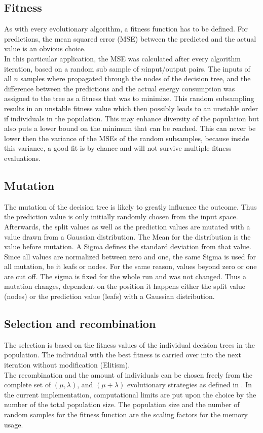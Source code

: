 \documentclass[conference]{IEEEtran}
\begin{document}
\subsection{Fitness}
As with every evolutionary algorithm, a fitness function has to be defined. For predictions, the mean squared error (MSE) between the predicted and the actual value is an obvious choice. \\
In this particular application, the MSE was calculated after every algorithm iteration, based on a random sub sample of $ n $input/output pairs. The inputs of all $n$ samples where propagated through the nodes of the decision tree, and the difference between the predictions and the actual energy consumption was assigned to the tree as a fitness that was to minimize. This random  subsampling results in an unstable fitness value which then possibly leads to an unstable order if individuals in the population. This may enhance diversity of the population but also puts a lower bound on the minimum that can be reached. This can never be lower then the variance of the MSEs of the random subsamples, because inside this variance, a good fit is by chance and will not survive multiple fitness evaluations.

\subsection{Mutation}
The mutation of the decision tree is likely to greatly influence the outcome. Thus the prediction value is only initially randomly chosen from the input space. Afterwards, the split values as well as the prediction values are mutated with a value drawn from a Gaussian distribution. The Mean for the distribution is the value before mutation. A Sigma defines the standard deviation from that value. Since all values are normalized between zero and one, the same Sigma is used for all mutation, be it leafs or nodes. For the same reason, values beyond zero or one are cut off. The sigma is fixed for the whole run and was not changed. Thus a mutation changes, dependent on the position it happens either the split value (nodes) or the prediction value (leafs) with a Gaussian distribution.

\subsection{Selection and recombination}
The selection is based on the fitness values of the individual decision trees in the population. The individual with the best fitness is carried over into the next iteration without modification (Elitism).\\
The recombination and the amount of individuals can be chosen freely from the complete set of $(\mu ,\lambda)$, and $(\mu + \lambda)$ evolutionary strategies as defined in \cite{rozenberg2011handbook}. In the current implementation, computational limits are put upon the choice by the number of the total population size. The population size and the number of random samples for the fitness function are the scaling factors for the memory usage.
\end{document}

